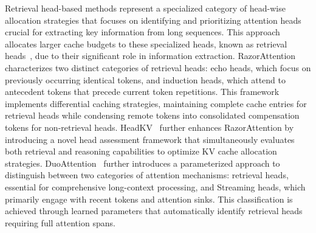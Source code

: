 Retrieval head-based methods represent a specialized category of head-wise allocation 
strategies that focuses on identifying and prioritizing attention heads crucial for extracting 
key information from long sequences. This approach allocates larger cache budgets to these 
specialized heads, known as retrieval heads~\cite{DBLP:journals/corr/abs-2404-15574}, due to their 
significant role in information extraction.
RazorAttention~\cite{DBLP:journals/corr/abs-2407-15891} characterizes two distinct categories 
of retrieval heads: echo heads, which focus on previously occurring identical tokens, and induction 
heads, which attend to antecedent tokens that precede current token repetitions. This framework 
implements differential caching strategies, maintaining complete cache entries for retrieval heads 
while condensing remote tokens into consolidated compensation tokens for non-retrieval heads.
HeadKV~\cite{DBLP:journals/corr/abs-2410-19258} further enhances RazorAttention by introducing a novel head 
assessment framework that simultaneously evaluates both retrieval and reasoning capabilities to 
optimize KV cache allocation strategies.
DuoAttention~\cite{DBLP:journals/corr/abs-2410-10819} further introduces a parameterized approach to 
distinguish between two categories of attention mechanisms: retrieval heads, essential for comprehensive 
long-context processing, and Streaming heads, which primarily engage with recent tokens and attention 
sinks. This classification is achieved through learned parameters that automatically identify retrieval 
heads requiring full attention spans.



